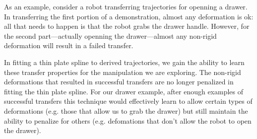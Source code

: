 As an example, consider a robot transferring
trajectories for openning a drawer. In transferring the first portion of a demonstration,
almost any deformation is ok: all that needs to happen is that the robot grabs the drawer handle.
However, for the second part---actually openning the drawer---almost any non-rigid deformation
will result in a failed transfer.

In fitting a thin plate spline to derived trajectories, we gain the ability 
to learn these transfer properties for the manipulation we are exploring.
The non-rigid deformations that resulted in successful transfers are no longer
penalized in fitting the thin plate spline. For our drawer example, after enough
examples of successful transfers this technique would effectively learn to allow
certain types of deformations (e.g. those that allow us to grab the drawer) but still
maintain the ability to penalize for others (e.g. defomations that don't allow the robot to
open the drawer).



